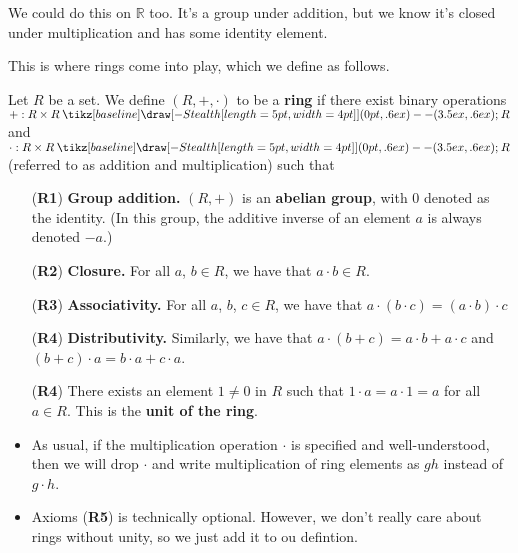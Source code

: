 \documentclass[12pt,letterpaper]{algebra_book}
\renewcommand{\to}{\mathbin{\tikz[baseline] \draw[-{Stealth[length=5pt,width=4pt]}] (0pt,.6ex) -- (3.5ex,.6ex);}}
\theoremstyle{definition}
\begin{document}
We could do this on $\mathbb{R}$ too. It's a group under addition,
but we know it's closed under multiplication and has some identity
element.

This is where rings come into play, which we define as follows. 

\begin{definition}
    Let $R$ be a set. We define $(R, +, \cdot)$ to be a \textbf{ring} if there
    exist binary operations $+: R\times R \to R$ and $\cdot: R
    \times R \to R$ (referred to as addition and multiplication)
    such that 
    \begin{itemize}
        \item[(\textbf{R1})] \textbf{Group addition.} $(R, +)$ is an
        \textbf{abelian group}, with $0$ denoted as the
        identity. (In this group, the additive inverse of
        an element $a$ is always denoted $-a$.)
        \item[(\textbf{R2})] \textbf{Closure.} For all $a$, $b \in R$, we have that $a \cdot b \in R$.
        \item[(\textbf{R3})] \textbf{Associativity.} For all $a$, $b$, $c \in R$, we have that $a \cdot (b \cdot c) = (a \cdot b) \cdot c$
        \item[(\textbf{R4})] \textbf{Distributivity.} Similarly, we have that $a \cdot (b + c) = a\cdot b + a \cdot c$ and $(b
        + c) \cdot a = b \cdot a + c \cdot a$.
        \item[(\textbf{R4})] There exists an element $1 \ne 0$ in $R$ such that 
        $1 \cdot a = a \cdot 1 = a$ for all $a \in R$. This is the \textbf{unit of the ring}. 
    \end{itemize}
\end{definition}

\begin{remark}
    \begin{itemize}
        \item As usual, if the multiplication operation $\cdot$ is specified and
        well-understood, then we will drop $\cdot$ and write
        multiplication of ring elements as $gh$ instead of $g \cdot h$.

        \item Axioms (\textbf{R5}) is technically optional. However, we don't really 
        care about rings without unity, so we just add it to ou defintion.
    \end{itemize}
\end{remark}
\end{document}
